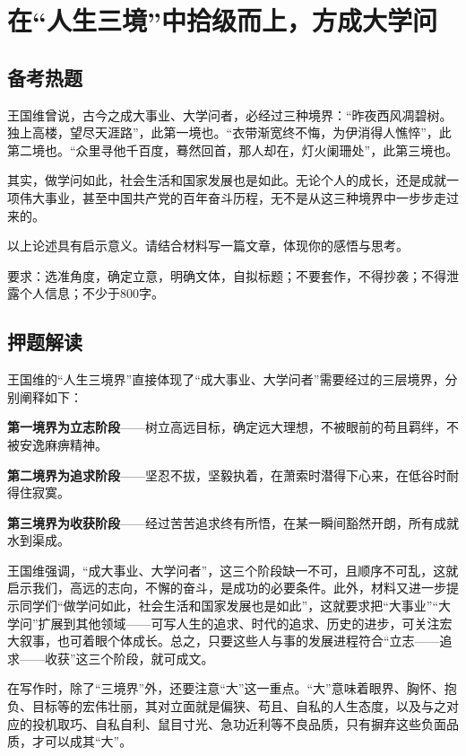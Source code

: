 
\section*{在“人生三境”中拾级而上，方成大学问}

\subsection*{备考热题}

王国维曾说，古今之成大事业、大学问者，必经过三种境界：“昨夜西风凋碧树。独上高楼，望尽天涯路”，此第一境也。“衣带渐宽终不悔，为伊消得人憔悴”，此第二境也。“众里寻他千百度，蓦然回首，那人却在，灯火阑珊处”，此第三境也。

其实，做学问如此，社会生活和国家发展也是如此。无论个人的成长，还是成就一项伟大事业，甚至中国共产党的百年奋斗历程，无不是从这三种境界中一步步走过来的。

以上论述具有启示意义。请结合材料写一篇文章，体现你的感悟与思考。

要求：选准角度，确定立意，明确文体，自拟标题；不要套作，不得抄袭；不得泄露个人信息；不少于800字。

\subsection*{押题解读}

王国维的“人生三境界”直接体现了“成大事业、大学问者”需要经过的三层境界，分别阐释如下：

\textbf{第一境界为立志阶段}——树立高远目标，确定远大理想，不被眼前的苟且羁绊，不被安逸麻痹精神。

\textbf{第二境界为追求阶段}——坚忍不拔，坚毅执着，在萧索时潜得下心来，在低谷时耐得住寂寞。

\textbf{第三境界为收获阶段}——经过苦苦追求终有所悟，在某一瞬间豁然开朗，所有成就水到渠成。

王国维强调，“成大事业、大学问者”，这三个阶段缺一不可，且顺序不可乱，这就启示我们，高远的志向，不懈的奋斗，是成功的必要条件。此外，材料又进一步提示同学们“做学问如此，社会生活和国家发展也是如此”，这就要求把“大事业”“大学问”扩展到其他领域——可写人生的追求、时代的追求、历史的进步，可关注宏大叙事，也可着眼个体成长。总之，只要这些人与事的发展进程符合“立志——追求——收获”这三个阶段，就可成文。

在写作时，除了“三境界”外，还要注意“大”这一重点。“大”意味着眼界、胸怀、抱负、目标等的宏伟壮丽，其对立面就是偏狭、苟且、自私的人生态度，以及与之对应的投机取巧、自私自利、鼠目寸光、急功近利等不良品质，只有摒弃这些负面品质，才可以成其“大”。

